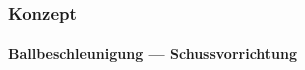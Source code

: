 \begin{frame}
    \frametitle{Konzept}
    \framesubtitle{Ballbeschleunigung ---  Schussvorrichtung}
\end{frame}

